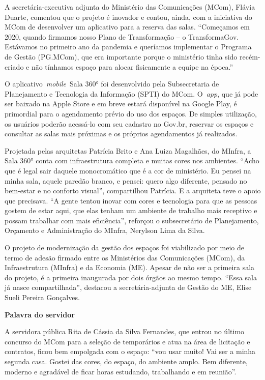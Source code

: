 \begin{itemize}
\begin{itemize}
{\begin{itemize}
A secretária-executiva adjunta do Ministério das Comunicações (MCom),
Flávia Duarte, comentou que o projeto é inovador e contou, ainda, com a
iniciativa do MCom de desenvolver um aplicativo para a reserva das
salas. ``Começamos em 2020, quando firmamos nosso Plano de Transformação
-- o TransformaGov. Estávamos no primeiro ano da pandemia e queríamos
implementar o Programa de Gestão (PG.MCom), que era importante porque o
ministério tinha sido recém-criado e não tínhamos espaço para alocar
fisicamente a equipe na época.''

O aplicativo~\emph{mobile}~Sala 360° foi desenvolvido pela Subsecretaria
de Planejamento e Tecnologia da Informação (SPTI) do MCom. O~\emph{app},
que já pode ser baixado na Apple Store e em breve estará disponível na
Google Play, é primordial para o agendamento prévio do uso dos espaços.
De simples utilização, os usuários poderão acessá-lo com seu cadastro no
Gov.br, reservar os espaços e consultar as salas mais próximas e os
próprios agendamentos já realizados.

Projetada pelas arquitetas Patrícia Brito e Ana Luiza Magalhães, do
MInfra, a Sala 360° conta com infraestrutura completa e muitas cores nos
ambientes. ``Acho que é legal sair daquele monocromático que é a cor de
ministério. Eu pensei na minha sala, aquele paredão branco, e pensei:
quero algo diferente, pensado no bem-estar e no conforto visual'',
compartilhou Patrícia. E a arquiteta teve o apoio que precisava. ``A
gente tentou inovar com cores e tecnologia para que as pessoas gostem de
estar aqui, que elas tenham um ambiente de trabalho mais receptivo e
possam trabalhar com mais eficiência'', reforçou o subsecretário de
Planejamento, Orçamento e Administração do MInfra, Nerylson Lima da
Silva.

O projeto de modernização da gestão dos espaços foi viabilizado por meio
de termo de adesão firmado entre os Ministérios das Comunicações (MCom),
da Infraestrutura (MInfra) e da Economia (ME). Apesar de não ser a
primeira sala do projeto, é a primeira inaugurada por dois órgãos ao
mesmo tempo. ``Essa sala já nasce compartilhada'', destacou a
secretária-adjunta de Gestão do ME, Elise Sueli Pereira Gonçalves.

\textbf{Palavra do servidor}

A servidora pública Rita de Cássia da Silva Fernandes, que entrou no
último concurso do MCom para a seleção de temporários e atua na área de
licitação e contratos, ficou bem empolgada com o espaço: ``vou usar
muito! Vai ser a minha segunda casa. Gostei das cores, do espaço, do
ambiente amplo. Bem diferente, moderno e agradável de ficar horas
estudando, trabalhando e em reunião''.


\end{itemize}}
\end{itemize}
\end{itemize}
